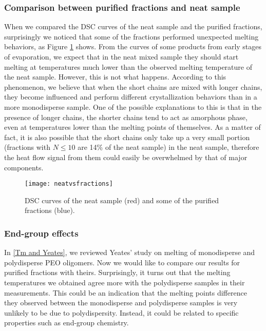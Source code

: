 \subsubsection{Comparison between purified fractions and neat sample}

When we compared the DSC curves of the neat sample and the purified fractions, surprisingly we noticed that some of the fractions performed unexpected melting behaviors, as Figure \ref{fig:neatvsfractions} shows. From the curves of some products from early stages of evaporation, we expect that in the neat mixed sample they should start melting at temperatures much lower than the observed melting temperature of the neat sample. However, this is not what happens. According to this phenomenon, we believe that when the short chains are mixed with longer chains, they become influenced and perform different crystallization behaviors than in a more monodisperse sample. One of the possible explanations to this is that in the presence of longer chains, the shorter chains tend to act as amorphous phase, even at temperatures lower than the melting points of themselves. As a matter of fact, it is also possible that the short chains only take up a very small portion (fractions with $N \leq 10$ are 14\% of the neat sample) in the neat sample, therefore the heat flow signal from them could easily be overwhelmed by that of major components.

\begin{figure}[H]
\center
\texttt{[image: neatvsfractions]}
\caption{DSC curves of the neat sample (red) and some of the purified fractions (blue).}
\label{fig:neatvsfractions}
\end{figure}

\subsubsection{End-group effects}

In \ref{Tm and Yeates}, we reviewed Yeates' study on melting of monodisperse and polydisperse PEO oligomers. Now we would like to compare our results for purified fractions with theirs. Surprisingly, it turns out that the melting temperatures we obtained agree more with the polydisperse samples in their measurements. This could be an indication that the melting points difference they observed between the monodisperse and polydisperse samples is very unlikely to be due to polydispersity. Instead, it could be related to specific properties such as end-group chemistry.

